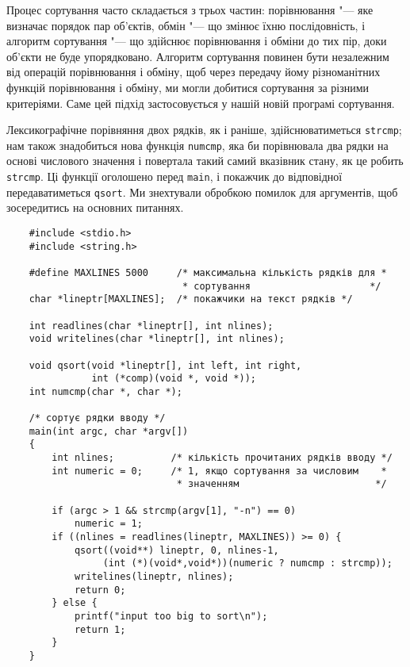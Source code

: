 \documentclass[a4paper,12pt]{book}
\begin{document}
  Процес сортування часто складається з трьох частин: порівнювання "--- яке визначає
  порядок пар об'єктів, обмін "--- що змінює їхню послідовність, і алгоритм сортування
  "--- що здійснює порівнювання і обміни до тих пір, доки об'єкти не буде упорядковано.
  Алгоритм сортування повинен бути незалежним від операцій порівнювання і обміну, щоб
  через передачу йому різноманітних функцій порівнювання і обміну, ми могли добитися
  сортування за різними критеріями. Саме цей підхід застосовується у нашій новій
  програмі сортування.

  Лексикографічне порівняння двох рядків, як і раніше, здійснюватиметься \texttt{strcmp};
  нам також знадобиться нова функція \texttt{numcmp}, яка би порівнювала два рядки
  на основі числового значення і повертала такий самий вказівник стану, як це робить
  \texttt{strcmp}. Ці функції оголошено перед \texttt{main}, і покажчик до відповідної
  передаватиметься \texttt{qsort}. Ми знехтували обробкою помилок для аргументів, щоб
  зосередитись на основних питаннях.

  \begin{verbatim}
    #include <stdio.h>
    #include <string.h>

    #define MAXLINES 5000     /* максимальна кількість рядків для *
                               * сортування                     */
    char *lineptr[MAXLINES];  /* покажчики на текст рядків */

    int readlines(char *lineptr[], int nlines);
    void writelines(char *lineptr[], int nlines);

    void qsort(void *lineptr[], int left, int right,
               int (*comp)(void *, void *));
    int numcmp(char *, char *);

    /* сортує рядки вводу */
    main(int argc, char *argv[])
    {
        int nlines;          /* кількість прочитаних рядків вводу */
        int numeric = 0;     /* 1, якщо сортування за числовим    *
                              * значенням                        */

        if (argc > 1 && strcmp(argv[1], "-n") == 0)
            numeric = 1;
        if ((nlines = readlines(lineptr, MAXLINES)) >= 0) {
            qsort((void**) lineptr, 0, nlines-1,
                 (int (*)(void*,void*))(numeric ? numcmp : strcmp));
            writelines(lineptr, nlines);
            return 0;
        } else {
            printf("input too big to sort\n");
            return 1;
        }
    }
  \end{verbatim}
\end{document}
